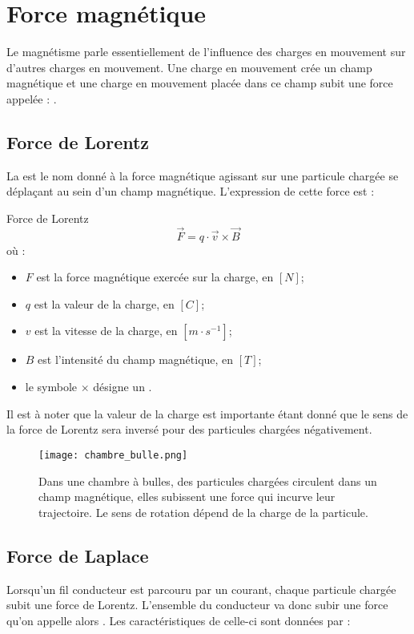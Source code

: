 \chapter{Force magnétique}
Le magnétisme parle essentiellement de l'influence des charges en mouvement sur d'autres charges en mouvement. Une charge en mouvement crée un champ magnétique et une charge en mouvement placée dans ce champ subit une force appelée : .
\section{Force de Lorentz}
La   est le nom donné à la force magnétique agissant sur une particule chargée se déplaçant au sein d'un champ magnétique. L'expression de cette force est :
\begin{encadre_equation*}{Force de Lorentz}
    \begin{equation}
        \vec{F}=q \cdot \vec{v} \times \vec{B}
    \end{equation} où :
    \begin{itemize}[label=\textbullet]
        \item \(F\) est la force magnétique exercée sur la charge, en \([N]\);
        \item \(q\) est la valeur de la charge, en \([C]\);
        \item \(v\) est la vitesse de la charge, en \([m \cdot s^{-1}]\);
        \item \(B\) est l'intensité du champ magnétique, en \([T]\);
        \item le symbole  \(\times\) désigne un .
    \end{itemize}
\end{encadre_equation*}
Il est à noter que la valeur de la charge est importante étant donné que le sens de la force de Lorentz sera inversé pour des particules chargées négativement.

\newpage

\begin{figure}[ht]
    \centering
    \texttt{[image: chambre\_bulle.png]}
    \caption{Dans une chambre à bulles, des particules chargées circulent dans un champ magnétique, elles subissent une force qui incurve leur trajectoire. Le sens de rotation dépend de la charge de la particule.}
    \label{chambre_bulle}
\end{figure}

\section{Force de Laplace}
Lorsqu'un fil conducteur est parcouru par un courant, chaque particule chargée subit une force de Lorentz. L'ensemble du conducteur va donc subir une force qu'on appelle alors . Les caractéristiques de celle-ci sont données par :

